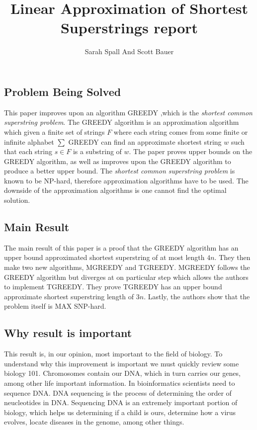 \documentclass[letterpaper,twocolumn,11pt,titlepage]{article}
\title{Linear Approximation of Shortest Superstrings report}
\author[1]{Sarah Spall And Scott Bauer}
\begin{document}
\maketitle
\newpage


\subsection*{Problem Being Solved}

This paper improves upon an algorithm GREEDY \cite{tarhio1988greedy},which is the \textit{shortest common superstring problem}. The GREEDY algorithm is an approximation algorithm which given a finite set of strings $F$ where each string comes from some finite or infinite alphabet $\sum$ GREEDY can find an approximate shortest string $w$ such that each string $s \in F$ is a substring of $w$. The paper proves upper bounds on the GREEDY algorithm, as well as improves upon the GREEDY algorithm to produce a better upper bound. The  \textit{shortest common superstring problem} is known to be NP-hard, therefore approximation algorithms have to be used. The downside of the approximation algorithms is one cannot find the optimal solution.  \cite{gallant1980finding}
 


\subsection*{Main Result}

The main result of this paper is a proof that the GREEDY algorithm has an upper bound approximated shortest superstring of at most length $4n$. They then make two new algorithms, MGREEDY and TGREEDY. MGREEDY follows the GREEDY algorithm but diverges at on particular step which allows the authors to implement TGREEDY. They prove TGREEDY has an upper bound approximate shortest superstring length of $3n$. Lastly, the authors show that the problem itself is MAX SNP-hard.

\subsection*{Why result is important}

This result is, in our opinion, most important to the field of biology. To understand why this improvement is important we must quickly review some biology 101. Chromosomes contain our DNA, which in turn carries our genes, among other life important information. In bioinformatics scientists need to sequence DNA. DNA sequencing is the process of determining the order of neucleotides in DNA. Sequencing DNA is an extremely important portion of biology, which helps us determining if a child is ours, determine how a virus evolves, locate diseases in the genome, among other things.
\end{document}
